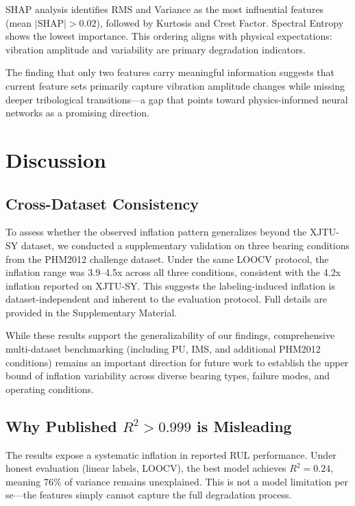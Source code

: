 \documentclass[5p,twocolumn]{elsarticle}
\begin{document}
SHAP analysis identifies RMS and Variance as the most influential features (mean $|\text{SHAP}| > 0.02$), followed by Kurtosis and Crest Factor. Spectral Entropy shows the lowest importance. This ordering aligns with physical expectations: vibration amplitude and variability are primary degradation indicators.

The finding that only two features carry meaningful information suggests that current feature sets primarily capture vibration amplitude changes while missing deeper tribological transitions---a gap that points toward physics-informed neural networks \cite{li2022physics} as a promising direction.


\section{Discussion}
\label{sec:discussion}

\subsection{Cross-Dataset Consistency}

To assess whether the observed inflation pattern generalizes beyond the XJTU-SY dataset, we conducted a supplementary validation on three bearing conditions from the PHM2012 challenge dataset. Under the same LOOCV protocol, the inflation range was 3.9--4.5x across all three conditions, consistent with the 4.2x inflation reported on XJTU-SY. This suggests the labeling-induced inflation is dataset-independent and inherent to the evaluation protocol. Full details are provided in the Supplementary Material.

While these results support the generalizability of our findings, comprehensive multi-dataset benchmarking (including PU, IMS, and additional PHM2012 conditions) remains an important direction for future work to establish the upper bound of inflation variability across diverse bearing types, failure modes, and operating conditions.

\subsection{Why Published $R^2 > 0.999$ is Misleading}

The results expose a systematic inflation in reported RUL performance. Under honest evaluation (linear labels, LOOCV), the best model achieves $R^2 = 0.24$, meaning 76\% of variance remains unexplained. This is not a model limitation per se---the features simply cannot capture the full degradation process.
\end{document}
